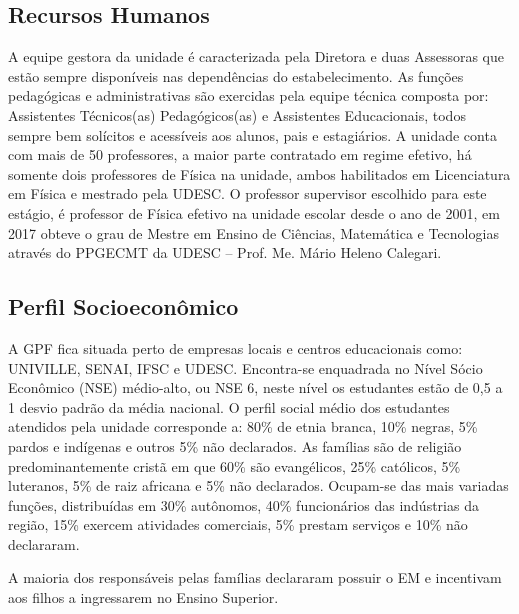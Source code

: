 \subsection{Recursos Humanos} %
\label{sub:Recursos Humanos}
A equipe gestora da unidade é caracterizada pela Diretora e duas Assessoras que estão sempre disponíveis nas dependências do estabelecimento. As funções pedagógicas e administrativas são exercidas pela equipe técnica composta por: Assistentes Técnicos(as) Pedagógicos(as) e Assistentes Educacionais, todos sempre bem solícitos e acessíveis aos alunos, pais e estagiários. A unidade conta com mais de 50 professores, a maior parte contratado em regime efetivo, há somente dois professores de Física na unidade, ambos habilitados em Licenciatura em Física e mestrado pela \ac{UDESC}. O professor supervisor escolhido para este estágio, é professor de Física efetivo na unidade escolar desde o ano de 2001, em 2017 obteve o grau de Mestre em Ensino de Ciências, Matemática e Tecnologias através do \ac{PPGECMT} da \ac{UDESC} -- Prof. Me. Mário Heleno Calegari.

\subsection{Perfil Socioeconômico} %
\label{sub:Perfil Socioeconômico}

A \ac{GPF} fica situada perto de empresas locais e centros educacionais como: UNIVILLE, SENAI, IFSC e UDESC. Encontra-se enquadrada no Nível Sócio Econômico (NSE) médio-alto, ou NSE 6, neste nível os estudantes estão de 0,5 a 1 desvio padrão da média nacional. O perfil social médio dos estudantes atendidos pela unidade corresponde a: 80\% de etnia branca, 10\% negras, 5\% pardos e indígenas e outros 5\% não declarados. As famílias são de religião predominantemente cristã em que 60\% são evangélicos, 25\% católicos, 5\% luteranos, 5\% de raiz africana e 5\% não declarados. Ocupam-se das mais variadas funções, distribuídas em 30\% autônomos, 40\% funcionários das indústrias da região, 15\% exercem atividades comerciais, 5\% prestam serviços e 10\% não declararam.

A maioria dos responsáveis pelas famílias declararam possuir o \ac{EM} e incentivam aos filhos a ingressarem no Ensino Superior. 

